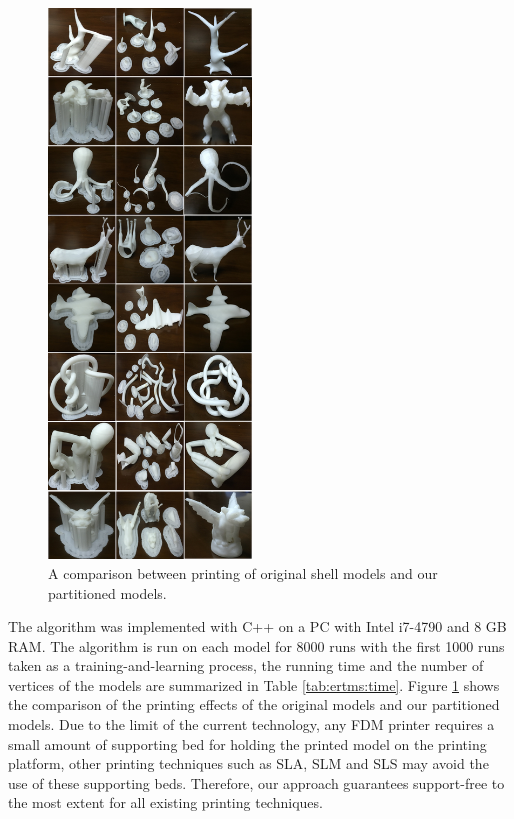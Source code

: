 \begin{figure}[tbp]
  \centering
  \includegraphics[width=0.48\textwidth]{figs/experiment.png}
  \caption{\label{fig:experiment}%
           A comparison between printing of original shell models and our partitioned models.}
\end{figure}

The algorithm was implemented with C++ on a PC with Intel i7-4790 and 8 GB RAM. The algorithm is run on each model for 8000 runs with the first 1000 runs taken as a training-and-learning process, the running time and the number of vertices of the models are summarized in Table \ref{tab:ertms:time}. Figure \ref{fig:experiment} shows the comparison of the printing effects of the original models and our partitioned models. Due to the limit of the current technology, any FDM printer requires a small amount of supporting bed for holding the printed model on the printing platform, other printing techniques such as SLA, SLM and SLS may avoid the use of these supporting beds. Therefore, our approach guarantees support-free to the most extent for all existing printing techniques.

